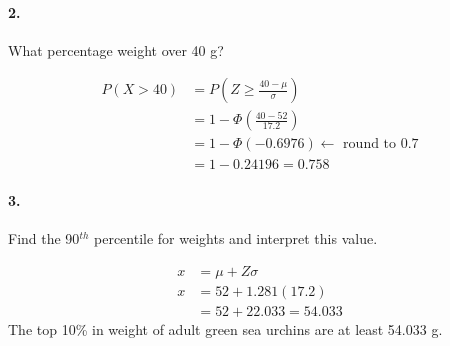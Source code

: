    \paragraph*{2.}
    What percentage weight over 40 g?
    \\
    \begin{mdframed}
        \begin{align*}
            P(X > 40)   & = P\left(Z \geq \frac{40-\mu}{\sigma}\right)                     \\
                        & = 1 - \Phi\left(\frac{40-52}{17.2}\right)             \\
                        & = 1 - \Phi(-0.6976) \leftarrow \text{ round to 0.7}   \\
                        & = 1 - 0.24196 = \boxed{0.758}
        \end{align*}
    \end{mdframed}

    \paragraph*{3.}
    Find the 90$^{th}$ percentile for weights and interpret this value.
    \\
    \begin{mdframed}
        \begin{align*}
            x   & = \mu + Z\sigma                   \\
            x   & = 52 + 1.281(17.2)                \\
                & = 52 + 22.033 = \boxed{54.033}
        \end{align*}
        The top 10\% in weight of adult green sea urchins are at least 54.033 g.
    \end{mdframed}

    \pagebreak

